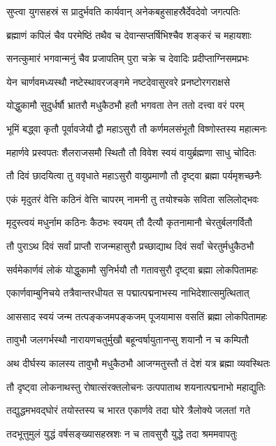 \twolineshloka
{सुप्त्वा युगसहस्रं स प्रादुर्भवति कार्यवान्}
{अनेकबहुसाहस्रैर्देवदेवो जगत्पतिः}


\twolineshloka
{ब्रह्माणं कपिलं चैव परमेष्ठिं तथैव च}
{देवान्सप्तर्षिभिश्चैव शङ्करं च महायशाः}


\twolineshloka
{सनत्कुमारं भगवान्मनुं चैव प्रजापतिम्}
{पुरा चक्रे च देवादिः प्रदीप्ताग्निसमप्रभः}


\twolineshloka
{येन चार्णवमध्यस्थौ नष्टेस्थावरजङ्गमे}
{नष्टदेवासुरवरे प्रनष्टोरगराक्षसे}


\twolineshloka
{योद्धुकामौ सुदुर्धर्षौ भ्रातरौ मधुकैठभौ}
{हतौ भगवता तेन ततो दत्त्वा वरं परम्}


\twolineshloka
{भूमिं बद्ध्वा कृतौ पूर्वावजेयौ द्वौ महाऽसुरौ}
{तौ कर्णमलसंभूतौ विष्णोस्तस्य महात्मनः}


\twolineshloka
{महार्णवे प्रस्वपतः शैलराजसमौ स्थितौ}
{तौ विवेश स्वयं वायुर्ब्रह्मणा साधु चोदितः}


\twolineshloka
{तौ दिवं छादयित्वा तु ववृधाते महाऽसुरौ}
{वायुप्रमाणौ तौ दृष्ट्वा ब्रह्मा पर्यमृशच्छनैः}


\twolineshloka
{एकं मृदुतरं वेत्ति कठिनं वेत्ति चापरम्}
{नामनी तु तयोश्चके सविता सलिलोद्भवः}


\twolineshloka
{मृदुस्त्वयं मधुर्नाम कठिनः कैठभः स्वयम्}
{तौ दैत्यौ कृतनामानौ चेरतुर्बलगर्वितौ}


\twolineshloka
{तौ पुराऽथ दिवं सर्वां प्राप्तौ राजन्महासुरौ}
{प्रच्छाद्याथ दिवं सर्वां चेरतुर्मधुकैठभौ}


\twolineshloka
{सर्वमेकार्णवं लोकं योद्धुकामौ सुनिर्भयौ}
{तौ गतावसुरौ दृष्ट्वा ब्रह्मा लोकपितामहः}


\twolineshloka
{एकार्णवाम्बुनिचये तत्रैवान्तरधीयत}
{स पद्मात्पद्मनाभस्य नाभिदेशात्समुत्थितात्}


\twolineshloka
{आससाद स्वयं जन्म तत्पङ्कजमपङ्कजम्}
{पूजयामास वसतिं ब्रह्मा लोकपितामहः}


\twolineshloka
{तावुभौ जलगर्भस्थौ नारायणचतुर्मुखौ}
{बहून्वर्षायुतानप्सु शयानौ न च कम्पितौ}


\twolineshloka
{अथ दीर्घस्य कालस्य तावुभौ मधुकैठभौ}
{आजग्मतुस्तौ तं देशं यत्र ब्रह्मा व्यवस्थितः}


\twolineshloka
{तौ दृष्ट्वा लोकनाथस्तु रोषात्संरक्तलोचनः}
{उत्पपाताथ शयनात्पद्मनाभो महाद्युतिः}


\twolineshloka
{तद्युद्धमभवद्घोरं तयोस्तस्य च भारत}
{एकार्णवे तदा घोरे त्रैलोक्ये जलतां गते}


\twolineshloka
{तदभूत्तुमुलं युद्धं वर्षसङ्ख्यासहस्रशः}
{न च तावसुरौ युद्धे तदा श्रममवापतुः}


